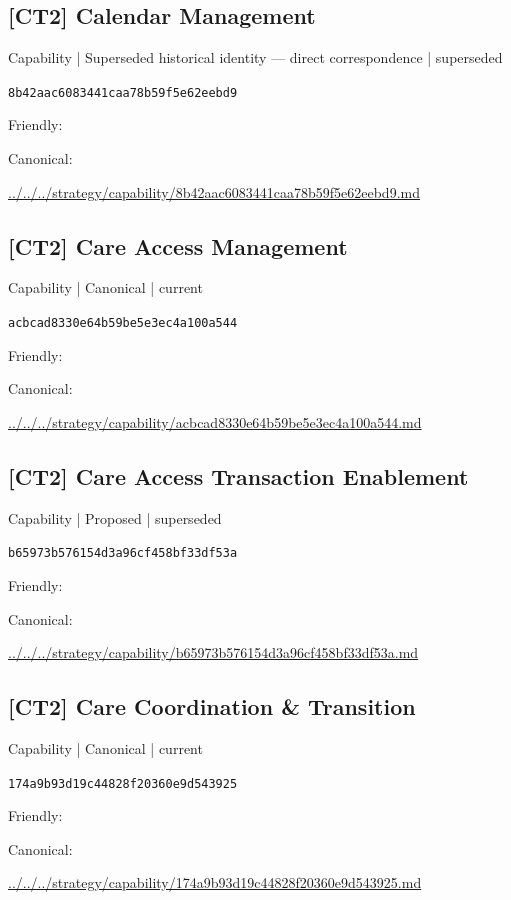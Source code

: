 \documentclass[10pt,a4paper]{article}
\begin{document}
\subsection*{[CT2] Calendar Management}
{\small Capability | Superseded historical identity — direct correspondence | superseded}\par
\texttt{8b42aac6083441caa78b59f5e62eebd9}\par
Friendly: \par
Canonical: \par
{\footnotesize\url{../../../strategy/capability/8b42aac6083441caa78b59f5e62eebd9.md}}\par
\subsection*{[CT2] Care Access Management}
{\small Capability | Canonical | current}\par
\texttt{acbcad8330e64b59be5e3ec4a100a544}\par
Friendly: \par
Canonical: \par
{\footnotesize\url{../../../strategy/capability/acbcad8330e64b59be5e3ec4a100a544.md}}\par
\subsection*{[CT2] Care Access Transaction Enablement}
{\small Capability | Proposed | superseded}\par
\texttt{b65973b576154d3a96cf458bf33df53a}\par
Friendly: \par
Canonical: \par
{\footnotesize\url{../../../strategy/capability/b65973b576154d3a96cf458bf33df53a.md}}\par
\subsection*{[CT2] Care Coordination \& Transition}
{\small Capability | Canonical | current}\par
\texttt{174a9b93d19c44828f20360e9d543925}\par
Friendly: \par
Canonical: \par
{\footnotesize\url{../../../strategy/capability/174a9b93d19c44828f20360e9d543925.md}}\par
\end{document}
